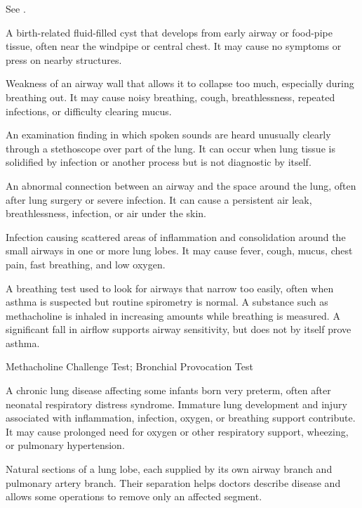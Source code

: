 See .

 A birth-related fluid-filled cyst that develops
from early airway or food-pipe tissue, often near the windpipe or central
chest. It may cause no symptoms or press on nearby structures.

 Weakness of an airway wall that allows it to collapse too much, especially during breathing out. It may cause noisy breathing, cough, breathlessness, repeated infections, or difficulty clearing mucus.

 An examination finding in which spoken sounds are heard unusually clearly through a stethoscope over part of the lung. It can occur when lung tissue is solidified by infection or another process but is not diagnostic by itself.

 An abnormal connection between an airway and the space around the lung, often after lung surgery or severe infection. It can cause a persistent air leak, breathlessness, infection, or air under the skin.

 Infection causing scattered areas of inflammation and consolidation around the small airways in one or more lung lobes. It may cause fever, cough, mucus, chest pain, fast breathing, and low oxygen.

 A breathing test used to look for airways that narrow too easily, often when asthma is suspected but routine spirometry is normal. A substance such as methacholine is inhaled in increasing amounts while breathing is measured. A significant fall in airflow supports airway sensitivity, but does not by itself prove asthma.

\synonyms
Methacholine Challenge Test; Bronchial Provocation Test

 A chronic lung disease affecting some infants born
very preterm, often after neonatal respiratory distress syndrome. Immature lung
development and injury associated with inflammation, infection, oxygen, or breathing
support contribute. It may cause prolonged need for oxygen or other respiratory support,
wheezing, or pulmonary hypertension.

 Natural sections of a lung lobe, each supplied by its own airway branch and pulmonary artery branch. Their separation helps doctors describe disease and allows some operations to remove only an affected segment.

